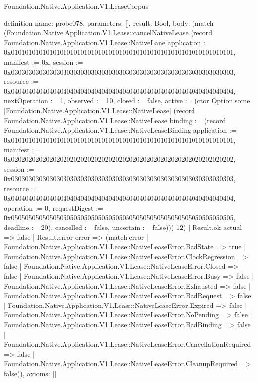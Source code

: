 \begin{lexlean}{Foundation.Native.Application.V1.LeaseCorpus}
\begin{semanticmodule}
definition{
  name: probe078,
  parameters: [],
  result: Bool,
  body: (match (Foundation.Native.Application.V1.Lease::cancelNativeLease (record Foundation.Native.Application.V1.Lease::NativeLane {application := 0x0101010101010101010101010101010101010101010101010101010101010101, manifest := 0x, session := 0x0303030303030303030303030303030303030303030303030303030303030303, resource := 0x0404040404040404040404040404040404040404040404040404040404040404, nextOperation := 1, observed := 10, closed := false, active := (ctor Option.some [Foundation.Native.Application.V1.Lease::NativeLease] (record Foundation.Native.Application.V1.Lease::NativeLease {binding := (record Foundation.Native.Application.V1.Lease::NativeLeaseBinding {application := 0x0101010101010101010101010101010101010101010101010101010101010101, manifest := 0x0202020202020202020202020202020202020202020202020202020202020202, session := 0x0303030303030303030303030303030303030303030303030303030303030303, resource := 0x0404040404040404040404040404040404040404040404040404040404040404, operation := 0, requestDigest := 0x0505050505050505050505050505050505050505050505050505050505050505, deadline := 20}), cancelled := false, uncertain := false}))}) 12)
    | Result.ok actual => false
    | Result.error error => (match error
      | Foundation.Native.Application.V1.Lease::NativeLeaseError.BadState => true
      | Foundation.Native.Application.V1.Lease::NativeLeaseError.ClockRegression => false
      | Foundation.Native.Application.V1.Lease::NativeLeaseError.Closed => false
      | Foundation.Native.Application.V1.Lease::NativeLeaseError.Busy => false
      | Foundation.Native.Application.V1.Lease::NativeLeaseError.Exhausted => false
      | Foundation.Native.Application.V1.Lease::NativeLeaseError.BadRequest => false
      | Foundation.Native.Application.V1.Lease::NativeLeaseError.Expired => false
      | Foundation.Native.Application.V1.Lease::NativeLeaseError.NoPending => false
      | Foundation.Native.Application.V1.Lease::NativeLeaseError.BadBinding => false
      | Foundation.Native.Application.V1.Lease::NativeLeaseError.CancellationRequired => false
      | Foundation.Native.Application.V1.Lease::NativeLeaseError.CleanupRequired => false)),
  axioms: []
}


\end{semanticmodule}
\end{lexlean}
